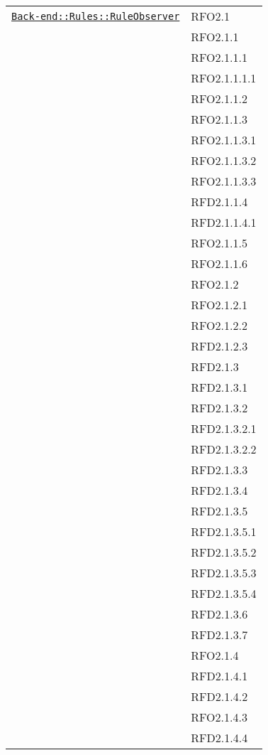 \begin{longtable}{|>{\centering}m{10cm}|m{3cm}<{\centering}|}
\hyperref[Back-end::Rules::RuleObserver]{\texttt{Back-end::Rules::RuleObserver}} & RFO2.1\\
& RFO2.1.1\\
& RFO2.1.1.1\\
& RFO2.1.1.1.1\\
& RFO2.1.1.2\\
& RFO2.1.1.3\\
& RFO2.1.1.3.1\\
& RFO2.1.1.3.2\\
& RFO2.1.1.3.3\\
& RFD2.1.1.4\\
& RFD2.1.1.4.1\\
& RFO2.1.1.5\\
& RFO2.1.1.6\\
& RFO2.1.2\\
& RFO2.1.2.1\\
& RFO2.1.2.2\\
& RFD2.1.2.3\\
& RFD2.1.3\\
& RFD2.1.3.1\\
& RFD2.1.3.2\\
& RFD2.1.3.2.1\\
& RFD2.1.3.2.2\\
& RFD2.1.3.3\\
& RFD2.1.3.4\\
& RFD2.1.3.5\\
& RFD2.1.3.5.1\\
& RFD2.1.3.5.2\\
& RFD2.1.3.5.3\\
& RFD2.1.3.5.4\\
& RFD2.1.3.6\\
& RFD2.1.3.7\\
& RFO2.1.4\\
& RFD2.1.4.1\\
& RFD2.1.4.2\\
& RFO2.1.4.3\\
& RFD2.1.4.4\\ \hline


\end{longtable}
